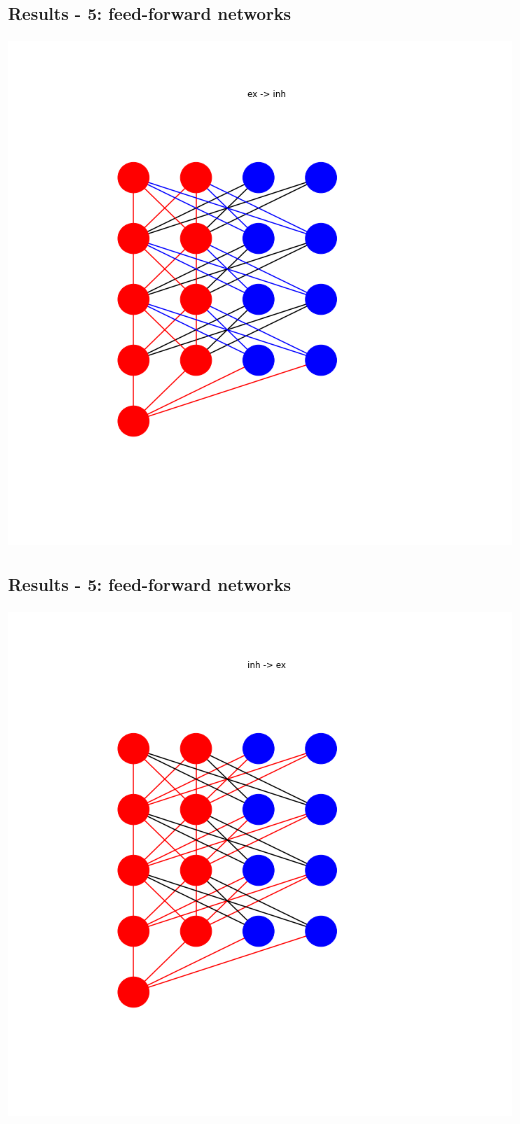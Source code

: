 \documentclass{beamer}
\begin{document}
\begin{frame}
    \frametitle{Results - 5: feed-forward networks}
    \includegraphics[width=\textwidth]{figures/ex_inh.png}
\end{frame}

\begin{frame}
    \frametitle{Results - 5: feed-forward networks}
    \includegraphics[width=\textwidth]{figures/inh_ex.png}
\end{frame}
\end{document}
